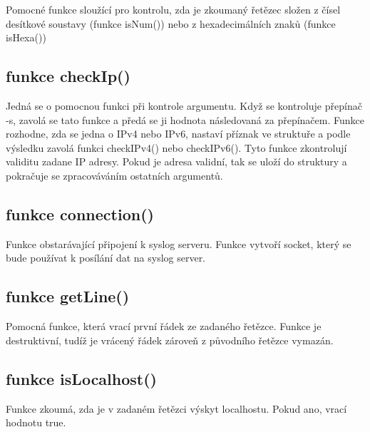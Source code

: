 \documentclass[a4paper]{article}
\begin{document}
	Pomocné funkce sloužící pro kontrolu, zda je zkoumaný řetězec složen z čísel desítkové soustavy (funkce isNum()) nebo z hexadecimálních znaků (funkce isHexa())

	\subsection{funkce checkIp()}
	\begin{sloppypar}
	Jedná se o pomocnou funkci při kontrole argumentu. Když se kontroluje přepínač -s, zavolá se tato funkce a předá se ji hodnota následovaná za přepínačem. Funkce rozhodne, zda se jedna o IPv4 nebo IPv6, nastaví příznak ve struktuře a podle výsledku zavolá funkci checkIPv4() nebo checkIPv6(). Tyto funkce zkontrolují validitu zadane IP adresy. Pokud je adresa validní, tak se uloží do struktury a pokračuje se zpracováváním ostatních argumentů.
	\end{sloppypar}
	\subsection{funkce connection()}

	Funkce obstarávající připojení k syslog serveru. Funkce vytvoří socket, který se bude používat k posílání dat na syslog server.

	\subsection{funkce getLine()}

	Pomocná funkce, která vrací první řádek ze zadaného řetězce. Funkce je destruktivní, tudíž je vrácený řádek zároveň z původního řetězce vymazán.

	\subsection{funkce isLocalhost()}

	Funkce zkoumá, zda je v zadaném řetězci výskyt localhostu. Pokud ano, vrací hodnotu true.
\end{document}

